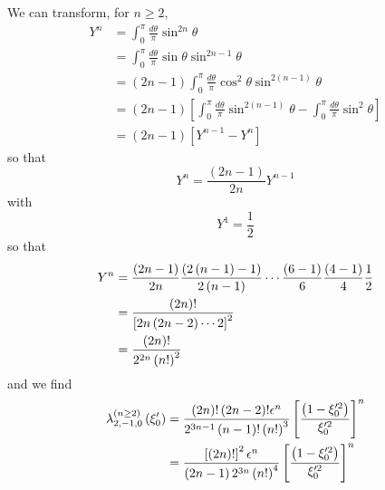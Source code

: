 We can transform, for $n\geq2$,
\begin{align*}
Y^{n} & =\int_{0}^{\pi}\frac{d\theta}{\pi}\sin^{2n}\theta \\
& =\int_{0}^{\pi}\frac{d\theta}{\pi}\sin\theta\sin^{2n-1}\theta \\
& =\left( 2n-1\right) \int_{0}^{\pi}\frac{d\theta}{\pi}\cos^{2}\theta
\sin^{2\left( n-1\right) }\theta \\
& =\left( 2n-1\right) \left[ \int_{0}^{\pi}\frac{d\theta}{\pi}\sin^{2\left(
n-1\right) }\theta-\int_{0}^{\pi}\frac{d\theta}{\pi}\sin ^{2}\theta\right] \\
& =\left( 2n-1\right) \left[ Y^{n-1}-Y^{n}\right]
\end{align*}
so that
\[
Y^{n}=\frac{\left( 2n-1\right) }{2n}Y^{n-1}
\]
with
\[
Y^{1}=\frac{1}{2}
\]
so that
\begin{align*}
Y^{n} & =\frac{\left( 2n-1\right) }{2n}\frac{\left( 2\left( n-1\right)
-1\right) }{2\left( n-1\right) }\cdots\frac{\left( 6-1\right) }{6}\frac{%
\left( 4-1\right) }{4}\frac{1}{2} \\
& =\frac{\left( 2n\right) !}{\left[ 2n\left( 2n-2\right) \cdots2\right] ^{2}}
\\
& =\frac{\left( 2n\right) !}{2^{2n}\left( n!\right) ^{2}}
\end{align*}
and we find
\begin{align}
\lambda_{2,-1,0}^{(n\geq2)}\left( \xi_{0}^{\prime}\right) & =\frac{\left(
2n\right) !\left( 2n-2\right) !\epsilon^{n}}{2^{3n-1}\left( n-1\right)
!\left( n!\right) ^{3}}\left[ \frac{\left( 1-\xi_{0}^{\prime2}\right) }{%
\xi_{0}^{\prime2}}\right] ^{n} \\
& =\frac{\left[ \left( 2n\right) !\right] ^{2}\epsilon^{n}}{\left(
2n-1\right) 2^{3n}\left( n!\right) ^{4}}\left[ \frac{\left( 1-\xi
_{0}^{\prime2}\right) }{\xi_{0}^{\prime2}}\right] ^{n}
\end{align}


